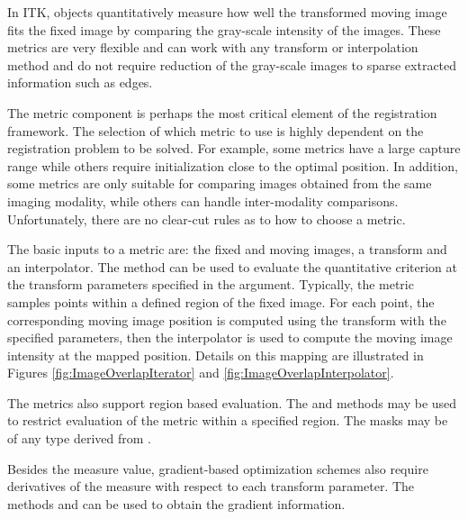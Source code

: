 %
%
%
%


In ITK,  objects quantitatively measure how well
the transformed moving image fits the fixed image by comparing the gray-scale
intensity of the images. These metrics are very flexible and can work with any
transform or interpolation method and do not require reduction of the
gray-scale images to sparse extracted information such as edges.

The metric component is perhaps the most critical element of the registration
framework. The selection of which metric to use is highly dependent on the
registration problem to be solved. For example, some metrics have a large
capture range while others require initialization close to the optimal
position.  In addition, some metrics are only suitable for comparing images 
obtained from the same imaging modality, while others can handle 
inter-modality comparisons.
Unfortunately, there are no clear-cut rules as to how to choose a metric.


The basic inputs to a metric are: the fixed and moving images, a transform and
an interpolator. The method  can be used to evaluate the
quantitative criterion at the transform parameters specified in the argument.
Typically, the metric samples points within a defined region of the fixed
image.  For each point, the corresponding moving image position is computed
using the transform with the specified parameters, then the interpolator is
used to compute the moving image intensity at the mapped position. Details on
this mapping are illustrated in Figures \ref{fig:ImageOverlapIterator} and
\ref{fig:ImageOverlapInterpolator}. 

The metrics also support region based evaluation. The  and 
 methods may be used to restrict evaluation of the metric 
within a specified region. The masks may be of any type derived from .

Besides the measure value, gradient-based optimization schemes also require
derivatives of the measure with respect to each transform parameter. The
methods  and  can be
used to obtain the gradient information.


